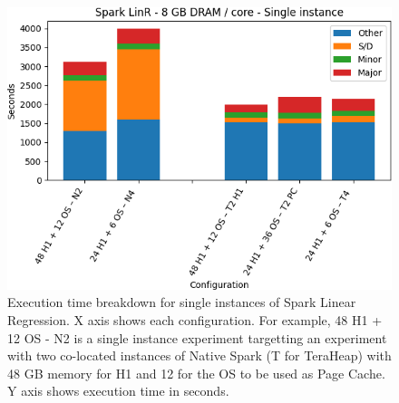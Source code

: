 \begin{figure}[thbp]

    \includegraphics[width=\linewidth]{./fig/linr128_single.png}
    \caption{Execution time breakdown for single instances of Spark
    Linear Regression. X axis shows each configuration.
        For example, 48 H1 + 12 OS - N2 is a single instance experiment targetting an experiment with two co-located instances of Native Spark (T for TeraHeap) with 48 GB memory for H1 and 12 for the OS to be used as Page Cache. Y axis shows execution time in seconds.}
    \label{fig:linr128_single}
\end{figure}

